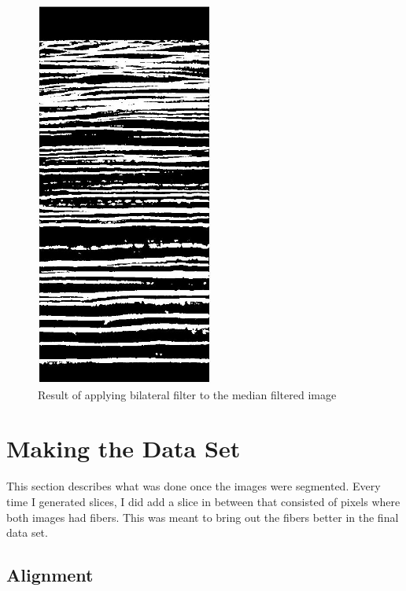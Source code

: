 \documentclass[11pt,psfig]{article}
\begin{document}
\begin{figure}[H]
\centering
\includegraphics[height=5in]{image1_bilateralFilterResult.jpg}
\caption{Result of applying bilateral filter to the median filtered image}
\end{figure}

\section{Making the Data Set}

This section describes what was done once the images were segmented. Every time I generated slices, I did add a slice in between that consisted of pixels where both images had fibers. This was meant to bring out the fibers better in the final data set. 

\subsection{Alignment}
\end{document}
